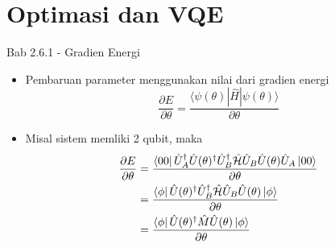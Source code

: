 \section{Optimasi dan VQE}

\begin{frame}{Bab 2.6.1 - Gradien Energi}
    \begin{itemize}
        \item Pembaruan parameter menggunakan nilai dari gradien energi
        \begin{equation}
            \frac{\partial E}{\partial \theta} = \frac{\langle\psi(\theta)|\hat{H}|\psi(\theta)\rangle}{\partial \theta}
        \end{equation}
        \item Misal sistem memliki 2 qubit, maka 
        \begin{equation}
            \begin{split}
            \frac{\partial E}{\partial \theta} &= \frac{\bra{00} \hat{U}_{A}^\dagger \hat{U}(\theta)^\dagger \hat{U}_{B}^\dagger \hat{\mathcal{H}} \hat{U}_{B} \hat{U}(\theta) \hat{U}_{A} \ket{00}}{\partial \theta} \\
            &= \frac{\bra{\phi} \hat{U}(\theta)^\dagger \hat{U}_{B}^\dagger \hat{\mathcal{H}} \hat{U}_{B} \hat{U}(\theta) \ket{\phi}}{\partial \theta} \\
            &= \frac{\bra{\phi} \hat{U}(\theta)^\dagger \hat{M} \hat{U}(\theta) \ket{\phi}}{\partial \theta}
            \end{split}
        \end{equation}
    \end{itemize}
\end{frame}

